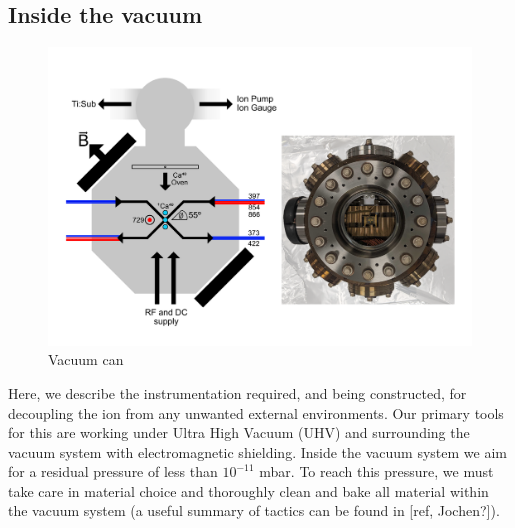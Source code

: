 \documentclass[12pt]{iopart}
\begin{document}



\subsection{Inside the vacuum}

\begin{figure}
  \begin{center}
   \noindent\includegraphics[width=\linewidth]{figures/vacuum_can.pdf}
  \end{center}
  \caption{Vacuum can}
  \label{fig:can}
\end{figure}

Here, we describe the instrumentation required, and being
constructed, for decoupling the ion from any unwanted external
environments. Our primary tools for this are working under Ultra High
Vacuum (UHV) and surrounding the vacuum system with electromagnetic
shielding. Inside the vacuum system we aim for a residual pressure of
less than $10^{-11}$ mbar. To reach this pressure, we must take
care in material choice and thoroughly clean and bake all material
within the vacuum system (a useful summary of tactics can be found in [ref, Jochen?]).
\end{document}
